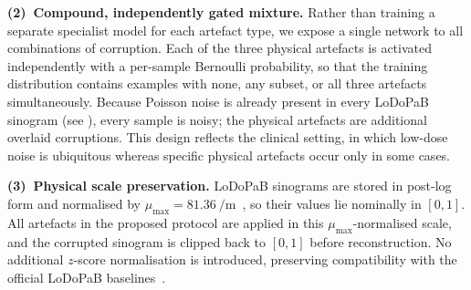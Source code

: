 \textbf{(2)~Compound, independently gated mixture.} Rather than training a separate specialist model for each artefact type, we expose a single network to all combinations of corruption. Each of the three physical artefacts is activated independently with a per-sample Bernoulli probability, so that the training distribution contains examples with none, any subset, or all three artefacts simultaneously. Because Poisson noise is already present in every \mbox{LoDoPaB} sinogram (see ), every sample is noisy; the physical artefacts are additional overlaid corruptions. This design reflects the clinical setting, in which low-dose noise is ubiquitous whereas specific physical artefacts occur only in some cases.

\textbf{(3)~Physical scale preservation.} \mbox{LoDoPaB} sinograms are stored in post-log form and normalised by $\mu_{\max}=\SI{81.36}{\per\metre}$~\cite{Leuschner2021}, so their values lie nominally in $[0,1]$. All artefacts in the proposed protocol are applied in this $\mu_{\max}$-normalised scale, and the corrupted sinogram is clipped back to $[0,1]$ before reconstruction. No additional $z$-score normalisation is introduced, preserving compatibility with the official \mbox{LoDoPaB} baselines~\cite{Leuschner2021, Kiss2024}.

